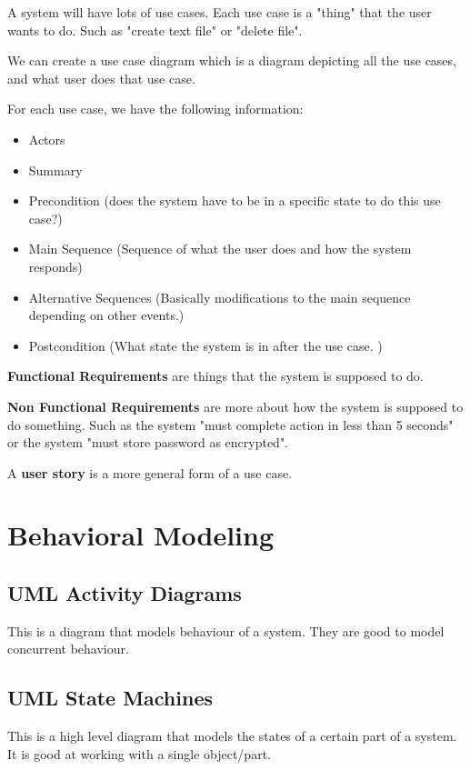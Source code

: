 \documentclass[12pt,letterpaper]{article} \usepackage{amsmath} \usepackage{graphicx} \usepackage[margin=1in]{geometry} \usepackage{longtable}  \usepackage{amssymb}
\begin{document}
	A system will have lots of use cases. Each use case is a "thing" that the user wants to do. Such as "create text file" or "delete file".
	
	We can create a use case diagram which is a diagram depicting all the use cases, and what user does that use case. 
	
	For each use case, we have the following information:
	\begin{itemize}[noitemsep]
		\item Actors
		\item Summary
		\item Precondition (does the system have to be in a specific state to do this use case?)
		\item Main Sequence (Sequence of what the user does and how the system responds)
		\item Alternative Sequences (Basically modifications to the main sequence depending on other events.)
		\item Postcondition (What state the system is in after the use case. )
	\end{itemize}

	\textbf{Functional Requirements} are things that the system is supposed to do. 
	
	\textbf{Non Functional Requirements} are more about how the system is supposed to do something. Such as the system "must complete action in less than 5 seconds" or the system "must store password as encrypted".
	
	A \textbf{user story} is a more general form of a use case.
 	
	\section{Behavioral Modeling}
	
	\subsection{UML Activity Diagrams}
	This is a diagram that models behaviour of a system. They are good to model concurrent behaviour. 
	
	\subsection{UML State Machines}
	This is a high level diagram that models the states of a certain part of a system. It is good at working with a single object/part. 
	
\end{document}
